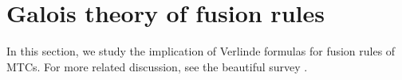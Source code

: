 \documentclass[12pt,psamsfonts]{amsart}
\numberwithin{equation}{section}
\theoremstyle{definition}
\begin{document}

\section{Galois theory of fusion rules}\label{galoistheory}

In this section, we study the implication of Verlinde formulas for
fusion rules of MTCs.  For more related
discussion, see the beautiful survey \cite{Gannon}.
\end{document}
